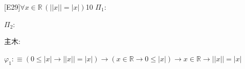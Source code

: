 \begin{fullproof}{[E29]}{$\forall x \in \mathbb{R}\,(\lvert \lvert x \rvert \rvert = \lvert x \rvert)$}{10}\label{tree:AbsAbs}
\noindent$\Pi_{1}$:
\begin{ptree}
\end{ptree}
\noindent$\Pi_{2}$:
\begin{ptree}
\end{ptree}
\noindent 主木:
\begin{ptree}
\noLine
{}
\noLine
{}
\end{ptree}
\begin{abbrevlist}
\item $\varphi_{1} :\equiv (0 \leq \lvert x \rvert \to \lvert \lvert x \rvert \rvert = \lvert x \rvert) \to (x \in \mathbb{R} \to 0 \leq \lvert x \rvert) \to x \in \mathbb{R} \to \lvert \lvert x \rvert \rvert = \lvert x \rvert$
\end{abbrevlist}
\end{fullproof}
